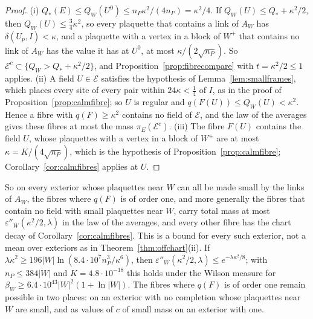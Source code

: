 \documentclass[11pt]{amsart}
\theoremstyle{definition}
\theoremstyle{remark}
\numberwithin{equation}{section}
\begin{document}
\begin{proof}
(i) $Q_*(E)\le Q_W(U^0)\le n_P\kappa^2/(4n_P)=\kappa^2/4$. If $Q_W(U)\le
Q_*+\kappa^2/2$, then $Q_W(U)\le\frac34\kappa^2$, so every plaquette that
contains a link of $A_W$ has $\delta(U_p,I)<\kappa$, and a plaquette with a
vertex in a block of $W^+$ that contains no link of $A_W$ has the value it
has at $U^0$, at most $\kappa/(2\sqrt{n_P})$. So $\mathcal E^c\subset\{Q_W>
Q_*+\kappa^2/2\}$, and Proposition~\ref{prop:fibrecompare} with $t=
\kappa^2/2\le1$ applies. (ii) A field $U\in\mathcal E$ satisfies the
hypothesis of Lemma~\ref{lem:smallframes}, which places every site of every
pair within $24\kappa<\frac14$ of $I$, as in the proof of
Proposition~\ref{prop:calmfibre}; so $U$ is regular and $q(F(U))\le Q_W(U)
<\kappa^2$. Hence a fibre with $q(F)\ge\kappa^2$ contains no field of
$\mathcal E$, and the law of the averages gives these fibres at most the mass
$\pi_E(\mathcal E^c)$. (iii) The fibre $F(U)$ contains the field $U$, whose
plaquettes with a vertex in a block of $W^+$ are at most $\kappa=K/(4\sqrt
{n_P})$, which is the hypothesis of Proposition~\ref{prop:calmfibre};
Corollary~\ref{cor:calmfibres} applies at $U$.
\end{proof}

So on every exterior whose plaquettes near $W$ can all be made small by the
links of $A_W$, the fibres where $q(F)$ is of order one, and more generally
the fibres that contain no field with small plaquettes near $W$, carry total
mass at most $\varepsilon''_W(\kappa^2/2,\lambda)$ in the law of the
averages, and every other fibre has the chart decay of
Corollary~\ref{cor:calmfibres}. This is a bound for every such exterior,
not a mean over exteriors as in Theorem~\ref{thm:offchart}(ii). If
$\lambda\kappa^2\ge196|W|\ln(8.4\cdot10^7n_P^3/\kappa^6)$, then
$\varepsilon''_W(\kappa^2/2,\lambda)\le e^{-\lambda\kappa^2/8}$; with
$n_P\le384|W|$ and $K=4.8\cdot10^{-18}$ this holds under the Wilson measure
for $\beta_W\ge6.4\cdot10^{43}|W|^2(1+\ln|W|)$. The fibres where $q(F)$ is of
order one remain possible in two places: on an exterior with no completion
whose plaquettes near $W$ are small, and as values of $c$ of small mass on
an exterior with one.
\end{document}
